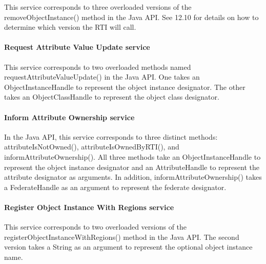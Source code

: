 \begin{compactstdpage}
    This service corresponds to three overloaded versions of the removeObjectInstance() method in the Java API. See 12.10 for details on how to determine which version the RTI will call.

    \paragraph{Request Attribute Value Update service}

    This service corresponds to two overloaded methods named requestAttributeValueUpdate() in the Java API. One takes an ObjectInstanceHandle to represent the object instance designator. The other takes an ObjectClassHandle to represent the object class designator.

    \paragraph{Inform Attribute Ownership \rtiinitiated{} service}

    In the Java API, this service corresponds to three distinct methods: attributeIsNotOwned(), attributeIsOwnedByRTI(), and informAttributeOwnership(). All three methods take an ObjectInstanceHandle to represent the object instance designator and an AttributeHandle to represent the attribute designator as arguments. In addition, informAttributeOwnership() takes a FederateHandle as an argument to represent the federate designator.

    \paragraph{Register Object Instance With Regions service}

    This service corresponds to two overloaded versions of the registerObjectInstanceWithRegions() method in the Java API. The second version takes a String as an argument to represent the optional object instance name.

\end{compactstdpage}

\clearpage

